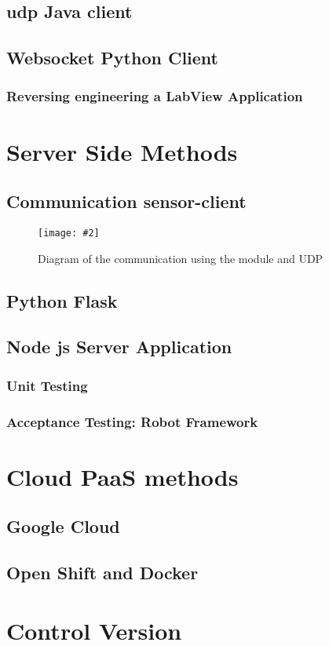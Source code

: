 \documentclass[hidelinks,11pt,a4paper,oneside,article]{memoir}
\numberwithin{equation}{chapter}
\newcommand{\putimage}[3][10] %
{
\begin{figure}[h]
	\centering
	\captionsetup{justification=centering}
	\texttt{[image: \#2]}
	\caption{#3}
	\label{fig:#2}
\end{figure}
}
\begin{document}
\subsection{\gls{udp} Java client}
\subsection{Websocket Python Client}
\subsubsection{Reversing engineering a LabView Application}

\section{Server Side Methods}
\subsection{Communication sensor-client}
	\putimage{communication_udp}{Diagram of the communication using the module and UDP}
\subsection{Python Flask}
\subsection{Node js Server Application}
\subsubsection{Unit Testing}
\subsubsection{Acceptance Testing: Robot Framework}

\section{Cloud PaaS methods}
\subsection{Google Cloud}
\subsection{Open Shift and Docker}

\section{Control Version}
\end{document}
